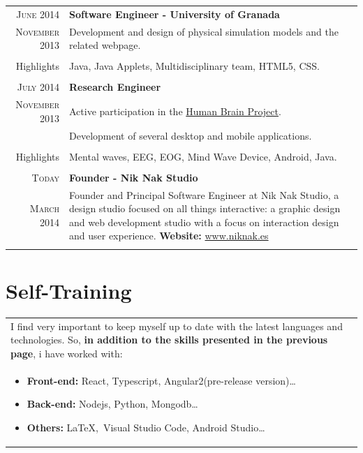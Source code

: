 \documentclass[a4paper,10pt]{article} %
\newcommand{\highlights}{\textcolor{linkcolour}{Highlights}}
\begin{document}
\begin{tabular}{r|p{11cm}}
\textsc{June 2014} & \textbf{Software Engineer - University of Granada} \\
\textsc{November 2013} 
& \footnotesize{Development and design of physical simulation models and the
related webpage.}\\
& \\
\highlights & Java, Java Applets, Multidisciplinary team, HTML5, CSS. \\
\multicolumn{2}{c}{} \\

\textsc{July 2014} & \textbf{Research Engineer} \\
\textsc{November 2013}
& \footnotesize{Active participation in the \href{https://www.humanbrainproject.eu/}{Human
Brain Project}.}\\
& \footnotesize{Development of several desktop and mobile
applications.} \\
& \\ 
\highlights & Mental waves, EEG, EOG,  Mind Wave Device, Android, Java. \\
\multicolumn{2}{c}{} \\

\textsc{Today} & \textbf{Founder - Nik Nak Studio} \\
\textsc{March 2014} 
& \footnotesize{Founder and Principal Software Engineer at Nik Nak Studio,  a
design studio focused on all things interactive: a graphic design and web 
development studio with a focus on interaction design and user experience.
\textbf{Website:}  \url{www.niknak.es}}\\
\multicolumn{2}{c}{} \\

\end{tabular}


\section{Self-Training}

\begin{tabular}{p{146mm}}
I find very important to keep myself up to date with the latest languages and
technologies. So, \textbf{in addition to the skills presented in the previous
page}, i have worked with: \\
\begin{itemize}
  \item \textbf{Front-end:} React, Typescript, Angular2(pre-release
  version)\ldots
  \item \textbf{Back-end:} Nodejs, Python, Mongodb\ldots
  \item \textbf{Others:} \LaTeX,\ Visual Studio Code, Android Studio\ldots
\end{itemize}



\multicolumn{1}{c}{}
\end{tabular}
\end{document}
